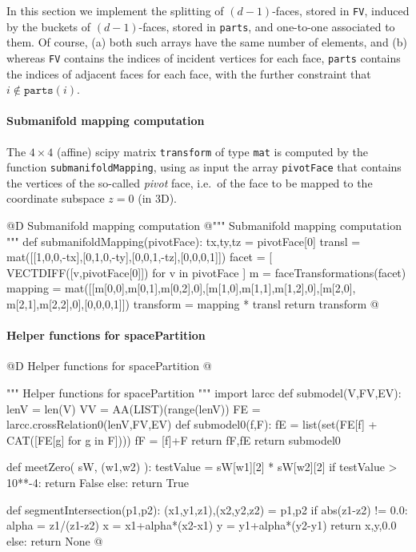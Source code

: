 \documentclass[11pt,oneside]{article}    %
\begin{document}
In this section we implement the splitting of $(d-1)$-faces, stored in \texttt{FV}, induced by the buckets of $(d-1)$-faces, stored in \texttt{parts}, and one-to-one associated to them. Of course, (a) both such arrays have the same number of elements, and (b) whereas \texttt{FV} contains the indices of incident vertices for each face, \texttt{parts}  contains the indices of adjacent faces for each face, with the further constraint that $i \not\in \texttt{parts}(i)$.
    
\paragraph{Submanifold mapping computation}
The $4\times 4$ (affine) scipy matrix \texttt{transform} of type \texttt{mat} is computed by the function \texttt{submanifoldMapping}, using as input the array \texttt{pivotFace} that contains the vertices of the so-called \emph{pivot} face, i.e.~of the face to be mapped to the coordinate subspace $z=0$ (in 3D).

@D Submanifold mapping computation
@{""" Submanifold mapping computation """
def submanifoldMapping(pivotFace):
    tx,ty,tz = pivotFace[0]
    transl = mat([[1,0,0,-tx],[0,1,0,-ty],[0,0,1,-tz],[0,0,0,1]])
    facet = [ VECTDIFF([v,pivotFace[0]]) for v in pivotFace ]
    m = faceTransformations(facet)
    mapping = mat([[m[0,0],m[0,1],m[0,2],0],[m[1,0],m[1,1],m[1,2],0],[m[2,0],
                    m[2,1],m[2,2],0],[0,0,0,1]])
    transform = mapping * transl
    return transform
@}

\paragraph{Helper functions for spacePartition}

@D Helper functions for spacePartition
@{""" Helper functions for spacePartition """
import larcc
def submodel(V,FV,EV):
    lenV = len(V)
    VV = AA(LIST)(range(lenV))
    FE = larcc.crossRelation0(lenV,FV,EV)
    def submodel0(f,F):
        fE = list(set(FE[f] + CAT([FE[g] for g in F])))
        fF = [f]+F
        return fF,fE
    return submodel0

def meetZero( sW, (w1,w2) ):
    testValue = sW[w1][2] * sW[w2][2]
    if testValue > 10**-4: 
        return False
    else: return True

def segmentIntersection(p1,p2):
    (x1,y1,z1),(x2,y2,z2) = p1,p2
    if abs(z1-z2) != 0.0:
        alpha = z1/(z1-z2)
        x = x1+alpha*(x2-x1)
        y = y1+alpha*(y2-y1)
        return x,y,0.0
    else: return None
@}
\end{document}

